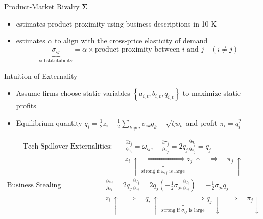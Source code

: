 \documentclass[
  10pt,
  aspectratio=169,   %
]{beamer}
\theoremstyle{plain}
\begin{document}
\begin{frame}{Product-Market Rivalry $\bm{\Sigma}$}

  \begin{itemize}
    \item \label{product_identification} \citet{Hoberg2016-jm} estimates product proximity using business descriptions in 10-K
          \medskip{}
    \item \citet{Pellegrino2024-dn} estimates $\alpha$ to align with the cross-price
          elasticity of demand
          \medskip{}
          \[
            \underbrace{\sigma_{ij}}_{\text{substitutability}}=\alpha\times\text{product proximity between }i\text{ and }j\quad\left(i\neq j\right)
          \]\hyperlink{micro_vs_ghl}{}
  \end{itemize}

\end{frame}

\begin{frame}{Intuition of Externality}
  \label{static_equilibrium}
  \begin{itemize}
    \item Assume firms choose static variables $\left\{a_{i,t}, b_{i,t}, q_{i,t}\right\}$ to maximize static profits \pause
    \item Equilibrium quantity $q_i = \frac{1}{2} z_i - \frac{1}{2}\sum_{k \neq i} \sigma_{ik} q_k - \sqrt{\zeta w_t}$ and profit $\pi_i = q_i^2$ \pause
  \end{itemize}
  \begin{align*}
    \text{Tech Spillover Externalities:} \quad &
    \frac{\partial \dot{z}_j}{\partial z_i} = \omega_{ij}, \quad
    \frac{\partial \pi_j}{\partial z_j} = 2 q_j \frac{\partial q_j}{\partial z_j} = q_j \\
    & z_i \ \uparrow \underbrace{\Longrightarrow}_{\text{strong if } \omega_{ij} \text{ is large}}   z_j \ \uparrow \quad \Longrightarrow \quad \pi_j \ \uparrow
  \end{align*}\pause
  \begin{align*}
    \text{Business Stealing Externalities:} \quad &
    \frac{\partial \pi_j}{\partial z_i} = 2 q_j \frac{\partial q_j}{\partial z_i}
    = 2 q_j \left(-\frac{1}{2}\sigma_{ji}\frac{\partial q_i}{\partial z_i}\right)
    = -\frac{1}{2}\sigma_{ji} q_j \\
    & z_i \ \uparrow \quad \Longrightarrow \quad q_i \ \uparrow \underbrace{\Longrightarrow}_{\text{strong if } \sigma_{ij} \text{ is large}} q_j \ \downarrow \quad \Longrightarrow \quad \pi_j  \downarrow
  \end{align*}
\end{frame}
\end{document}
